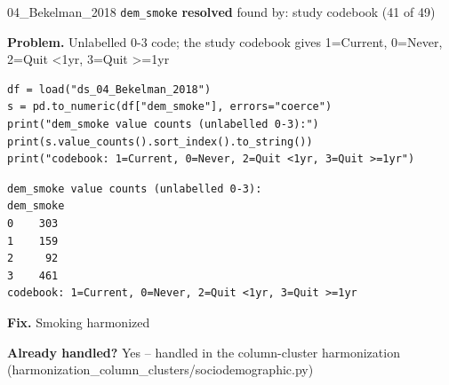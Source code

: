 \documentclass[9pt, t, handout]{beamer}
\newcommand{\ans}[1]{\textcolor{structure.fg}{#1}}
\begin{document}
\begin{frame}[fragile]{04\_Bekelman\_2018 \quad \texttt{dem\_smoke}}
  {\scriptsize\textcolor{green!45!black}{\textbf{resolved}} \quad
   found by: study codebook \quad (41 of 49)}
  \vspace{3pt}

  {\footnotesize \textbf{Problem.} Unlabelled 0-3 code; the study codebook gives 1=Current, 0=Never, 2=Quit <1yr, 3=Quit >=1yr}
  \vspace{4pt}

  \begin{Verbatim}[fontsize=\tiny, frame=single, framesep=2pt, label=\tiny reproduce]
df = load("ds_04_Bekelman_2018")
s = pd.to_numeric(df["dem_smoke"], errors="coerce")
print("dem_smoke value counts (unlabelled 0-3):")
print(s.value_counts().sort_index().to_string())
print("codebook: 1=Current, 0=Never, 2=Quit <1yr, 3=Quit >=1yr")
  \end{Verbatim}
  \begin{Verbatim}[fontsize=\tiny, frame=single, framesep=2pt, label=\tiny output]
dem_smoke value counts (unlabelled 0-3):
dem_smoke
0    303
1    159
2     92
3    461
codebook: 1=Current, 0=Never, 2=Quit <1yr, 3=Quit >=1yr
  \end{Verbatim}
  \vspace{2pt}

  {\footnotesize \textbf{Fix.} Smoking harmonized}
  \vspace{2pt}

  {\footnotesize \textbf{Already handled?} \ans{Yes} -- handled in the column-cluster harmonization
   (harmonization\_column\_clusters/sociodemographic.py)}
\end{frame}
\end{document}
